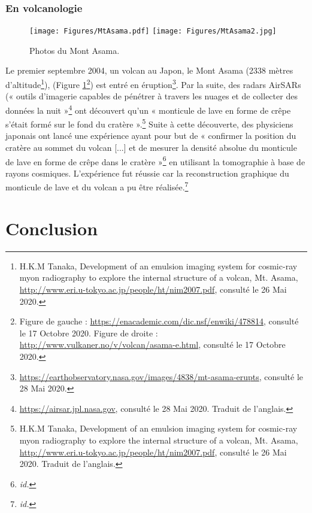 \documentclass[a4paper, 12pt]{article}
\begin{document}
\begin{spacing}{1.5}
\subsubsection{En volcanologie}

\begin{figure}[t]
\begin{center}
\texttt{[image: Figures/MtAsama.pdf]}
\texttt{[image: Figures/MtAsama2.jpg]}
\caption{\label{fig:Asama}Photos du Mont Asama.}
\end{center}
\end{figure}

Le premier septembre 2004, un volcan au Japon, le Mont Asama (2338 mètres d'altitude\footnote{H.K.M Tanaka, Development of an emulsion imaging system for cosmic-ray myon radiography to explore the internal structure of a volcan, Mt. Asama, \url{http://www.eri.u-tokyo.ac.jp/people/ht/nim2007.pdf}, consulté le 26 Mai 2020.}), (Figure \ref{fig:Asama}\footnote{Figure de gauche : \url{https://enacademic.com/dic.nsf/enwiki/478814}, consulté le 17 Octobre 2020. Figure de droite : \url{http://www.vulkaner.no/v/volcan/asama-e.html}, consulté le 17 Octobre 2020.}) est entré en éruption\footnote{\url{https://earthobservatory.nasa.gov/images/4838/mt-asama-erupts}, consulté le 28 Mai 2020.}. Par la suite, des radars AirSARs (« outils d'imagerie capables de pénétrer à travers les nuages et de collecter des données la nuit »\footnote{\url{https://airsar.jpl.nasa.gov}, consulté le 28 Mai 2020. Traduit de l'anglais.} ont découvert qu'un « monticule de lave en forme de crêpe s'était formé sur le fond du cratère ».\footnote{H.K.M Tanaka, Development of an emulsion imaging system for cosmic-ray myon radiography to explore the internal structure of a volcan, Mt. Asama, \url{http://www.eri.u-tokyo.ac.jp/people/ht/nim2007.pdf}, consulté le 26 Mai 2020. Traduit de l'anglais.} Suite à cette découverte, des physiciens japonais ont lancé une expérience ayant pour but de « confirmer la position du cratère au sommet du volcan [...] et de mesurer la densité absolue du monticule de lave en forme de crêpe dans le cratère »\footnote{\emph{id.}} en utilisant la tomographie à base de rayons cosmiques. L'expérience fut réussie car la reconstruction graphique du monticule de lave et du volcan a pu être réalisée.\footnote{\emph{id.}}


\pagebreak

\section{Conclusion}


\end{spacing}
\end{document}
